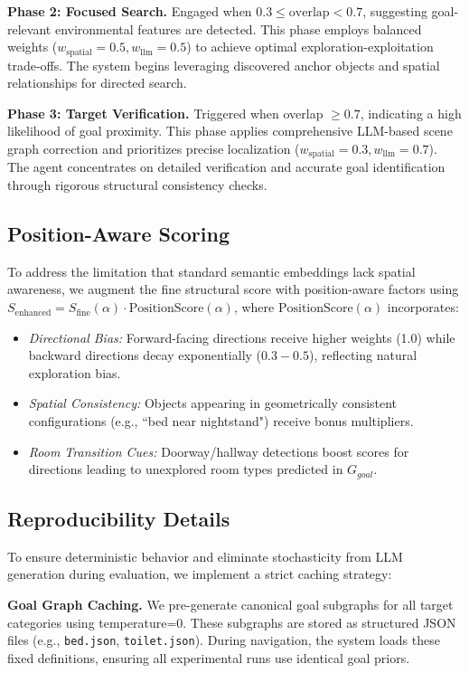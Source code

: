 \documentclass{article}
\begin{document}
\textbf{Phase 2: Focused Search.} Engaged when $0.3 \leq \text{overlap} < 0.7$, suggesting goal-relevant environmental features are detected. This phase employs balanced weights ($w_{\text{spatial}}=0.5, w_{\text{llm}}=0.5$) to achieve optimal exploration-exploitation trade-offs. The system begins leveraging discovered anchor objects and spatial relationships for directed search.

\textbf{Phase 3: Target Verification.} Triggered when overlap $\geq 0.7$, indicating a high likelihood of goal proximity. This phase applies comprehensive LLM-based scene graph correction and prioritizes precise localization ($w_{\text{spatial}}=0.3, w_{\text{llm}}=0.7$). The agent concentrates on detailed verification and accurate goal identification through rigorous structural consistency checks.

\subsection{Position-Aware Scoring}

To address the limitation that standard semantic embeddings lack spatial awareness, we augment the fine structural score with position-aware factors using $S_{\text{enhanced}} = S_{\text{fine}}(\alpha) \cdot \text{PositionScore}(\alpha)$, where $\text{PositionScore}(\alpha)$ incorporates:
\begin{itemize}
    \item \textit{Directional Bias:} Forward-facing directions receive higher weights (1.0) while backward directions decay exponentially ($0.3-0.5$), reflecting natural exploration bias.
    \item \textit{Spatial Consistency:} Objects appearing in geometrically consistent configurations (e.g., ``bed near nightstand") receive bonus multipliers.
    \item \textit{Room Transition Cues:} Doorway/hallway detections boost scores for directions leading to unexplored room types predicted in $G_{goal}$.
\end{itemize}

\subsection{Reproducibility Details}

To ensure deterministic behavior and eliminate stochasticity from LLM generation during evaluation, we implement a strict caching strategy:

\textbf{Goal Graph Caching.} We pre-generate canonical goal subgraphs for all target categories using temperature=0. These subgraphs are stored as structured JSON files (e.g., \texttt{bed.json}, \texttt{toilet.json}). During navigation, the system loads these fixed definitions, ensuring all experimental runs use identical goal priors.
\end{document}
